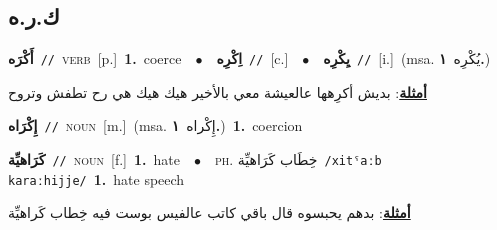 \documentclass[10pt,a4paper,twoside]{article} %
\begin{document}
\begin{multicols}{2}
\vspace{-3mm}
\subsection*{\color{blue}\foreignlanguage{arabic}{ك.ر.ه}\color{blue}{}} 

{\setlength\topsep{0pt}\textbf{\foreignlanguage{arabic}{أَكْرَه}}\ {\color{gray}\texttt{//}\color{black}}\ \textsc{verb}\ [p.]\ \textbf{1.}~coerce\ \ $\bullet$\ \ \setlength\topsep{0pt}\textbf{\foreignlanguage{arabic}{اِكْرِه}}\ {\color{gray}\texttt{//}\color{black}}\ [c.]\ \ $\bullet$\ \ \setlength\topsep{0pt}\textbf{\foreignlanguage{arabic}{يِكْرِه}}\ {\color{gray}\texttt{//}\color{black}}\ [i.]\ \color{gray}(msa. \foreignlanguage{arabic}{يُكْرِه}~\foreignlanguage{arabic}{\textbf{١.}})\color{black}\  \begin{flushright}\color{gray}\foreignlanguage{arabic}{\textbf{\underline{\foreignlanguage{arabic}{أمثلة}}}: بديش أكرِهها عالعيشة معي بالأخير هيك هيك هي رح تطفش وتروح}\end{flushright}\color{black}} \vspace{2mm}

{\setlength\topsep{0pt}\textbf{\foreignlanguage{arabic}{إِكْرَاه}}\ {\color{gray}\texttt{//}\color{black}}\ \textsc{noun}\ [m.]\ \color{gray}(msa. \foreignlanguage{arabic}{إِكْراه}~\foreignlanguage{arabic}{\textbf{١.}})\color{black}\ \textbf{1.}~coercion\ } \vspace{2mm}

{\setlength\topsep{0pt}\textbf{\foreignlanguage{arabic}{كَرَاهيِّة}}\ {\color{gray}\texttt{//}\color{black}}\ \textsc{noun}\ [f.]\ \textbf{1.}~hate\ \ $\bullet$\ \ \textsc{ph.} \color{gray} \foreignlanguage{arabic}{خِطَاب كَرَاهيِّة}\color{black}\ {\color{gray}\texttt{/{\sffamily xitˤaːb karaːhijje}/}\color{black}}\ \textbf{1.}~hate speech\  \begin{flushright}\color{gray}\foreignlanguage{arabic}{\textbf{\underline{\foreignlanguage{arabic}{أمثلة}}}: بدهم يحبسوه قال باقي كاتب عالفيس بوست فيه خِطاب كَراهيِّة}\end{flushright}\color{black}} \vspace{2mm}


\end{multicols}
\end{document}
